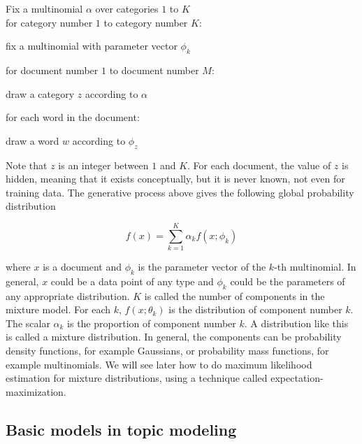 \documentclass[12pt]{report}
\begin{document}
\begin{enumerate}
\item Fix a multinomial $\alpha$ over categories $1$ to $K$\\
for category number $1$ to category number $K$:
\begin{description}
\item   fix a multinomial with parameter vector $\phi_k$
\end{description}

\item for document number $1$ to document number $M$:
\begin{description}
\item draw a category $z$ according to $\alpha$
\item for each word in the document:
  	\begin{description}
  	\item	draw a word $w$ according to $\phi_z$
  	\end{description}
\end{description}
\end{enumerate}

Note that $z$ is an integer between $1$ and $K$. 
For each document, the value of $z$ is hidden, meaning that it exists conceptually, but it is never known, not even for training data. 
The generative process above gives the following global probability distribution

\begin{equation}
f(x) = \sum\limits_{k=1}^K \alpha_k f(x;\phi_k)
\end{equation}

where $x$ is a document and $\phi_k$ is the parameter vector of the $k$-th multinomial. 
In general, $x$ could be a data point of any type and $\phi_k$ could be the parameters of any appropriate distribution. 
$K$ is called the number of components in the mixture model. 
For each $k$, $f (x; \theta_k)$ is the distribution of component number $k$. 
The scalar $\alpha_k$ is the proportion of component number $k$. 
A distribution like this is called a mixture distribution. 
In general, the components can be probability density functions, for example Gaussians, or probability mass functions, for example multinomials. 
We will see later how to do maximum likelihood estimation for mixture distributions, using a technique called expectation-maximization.


\subsection{Basic models in topic modeling}
\end{document}
